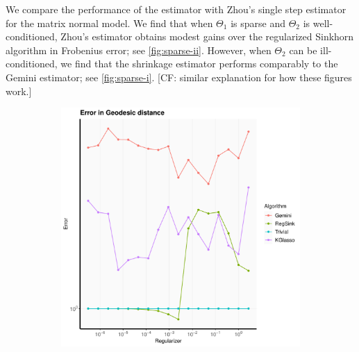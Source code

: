 \documentclass[aos]{imsart}
\theoremstyle{definition}
\numberwithin{equation}{section}
\newcommand{\CF}[1]{{\color{purple}[CF: #1]}}
\begin{document}
We compare the performance of the estimator with Zhou's single step estimator \cite{zhou2014gemini} for the matrix normal model. We find that when $\Theta_1$ is sparse and $\Theta_2$ is well-conditioned, Zhou's estimator obtains modest gains over the regularized Sinkhorn algorithm in Frobenius error; see \cref{fig:sparse-ii}. However, when $\Theta_2$ can be ill-conditioned, we find that the shrinkage estimator performs comparably to the Gemini estimator; see \cref{fig:sparse-i}.  \CF{similar explanation for how these figures work.}
\begin{figure}
     \centering
     \begin{subfigure}[b]{0.3\textwidth}
         \centering
         \includegraphics[width=\textwidth]{./code/zhou-comparison/25-50-sparse-geo.pdf}
     \end{subfigure}
     \hfill
     \begin{subfigure}[b]{0.3\textwidth}
         \centering

\end{subfigure}
\end{figure}
\end{document}
